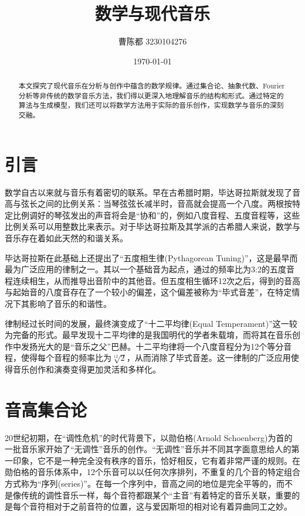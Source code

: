 \documentclass{article}
\title{\textbf{数学与现代音乐}}
\author{曹陈都 3230104276}
\date{\today}
\begin{document}
\maketitle

\begin{abstract}
\label{abstract}
本文探究了现代音乐在分析与创作中蕴含的数学规律。通过集合论、抽象代数、Fourier 分析等非传统的数学音乐方法，我们得以更深入地理解音乐的结构和形式。通过特定的算法与生成模型，我们还可以将数学方法用于实际的音乐创作，实现数学与音乐的深刻交融。
\end{abstract}

\section{引言}
\label{sec:introduction}
数学自古以来就与音乐有着密切的联系。早在古希腊时期，毕达哥拉斯就发现了音高与弦长之间的比例关系：当琴弦弦长减半时，音高就会提高一个八度\cite{math_history_2017}。两根按特定比例调好的琴弦发出的声音将会是“协和”的，例如八度音程、五度音程等，这些比例关系可以用整数比来表示。对于毕达哥拉斯及其学派的古希腊人来说，数学与音乐存在着如此天然的和谐关系。

毕达哥拉斯在此基础上还提出了“五度相生律(Pythagorean Tuning)”，这是最早而最为广泛应用的律制之一。其以一个基础音为起点，通过的频率比为3:2的五度音程连续相生，从而推导出音阶中的其他音。但五度相生循环12次之后，得到的音高与起始音的八度音存在了一个较小的偏差，这个偏差被称为“毕式音差”，在特定情况下其影响了音乐的和谐性。

律制经过长时间的发展，最终演变成了“十二平均律(Equal Temperament)”这一较为完备的形式。最早发现十二平均律的是我国明代的学者朱载堉，而将其在音乐创作中发扬光大的是“音乐之父”巴赫。十二平均律将一个八度音程分为12个等分音程，使得每个音程的频率比为$\sqrt[12]{2}$，从而消除了毕式音差。这一律制的广泛应用使得音乐创作和演奏变得更加灵活和多样化\cite{math_art_2021}。

\section{音高集合论}
\label{sec:pitch_set_theory}
20世纪初期，在“调性危机”的时代背景下，以勋伯格(Arnold Schoenberg)为首的一批音乐家开始了“无调性”音乐的创作。“无调性”音乐并不同其字面意思给人的第一印象，它不是一种完全没有秩序的音乐，恰好相反，它有着非常严谨的规则。在勋伯格的音乐体系中，12个乐音可以以任何次序排列，不重复的几个音的特定组合方式称为“序列(series)”。在每一个序列中，音高之间的地位是完全平等的，而不是像传统的调性音乐一样，每个音符都跟某个“主音”有着特定的音乐关联，重要的是每个音符相对于之前音符的位置，这与爱因斯坦的相对论有着异曲同工之妙\cite{how_music_is_made_2021}。
\end{document}
